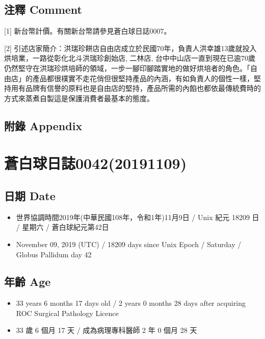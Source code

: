 \documentclass[a5paper, 12pt
]{book}
\providecommand{\tightlist}{%
  \setlength{\itemsep}{0pt}\setlength{\parskip}{0pt}}
\begin{document}
\hypertarget{ux6ce8ux91cb-comment-34}{%
\subsection{注釋 Comment}\label{ux6ce8ux91cb-comment-34}}

{[}1{]} 新台幣計價。有關新台幣請參見蒼白球日誌0007。

{[}2{]}
引述店家簡介：洪瑞珍餅店自由店成立於民國70年，負責人洪幸雄13歲就投入烘培業，一路從彰化北斗洪瑞珍創始店,
二林店,
台中中山店一直到現在已逾70歲仍然堅守在洪瑞珍烘培師的領域，一步一腳印腳踏實地的做好烘培者的角色。「自由店」的產品都很樸實不走花俏但很堅持產品的內涵，有如負責人的個性一樣，堅持用有品牌有信譽的原料也是自由店的堅持，產品所需的內餡也都依最傳統費時的方式來蒸煮自製這是保護消費者最基本的態度。

\hypertarget{ux9644ux9304-appendix-33}{%
\subsection{附錄 Appendix}\label{ux9644ux9304-appendix-33}}

\hypertarget{ux84bcux767dux7403ux65e5ux8a8c004220191109}{%
\section{蒼白球日誌0042(20191109)}\label{ux84bcux767dux7403ux65e5ux8a8c004220191109}}

\hypertarget{ux65e5ux671f-date-41}{%
\subsection{日期 Date}\label{ux65e5ux671f-date-41}}

\begin{itemize}
\tightlist
\item
  世界協調時間2019年(中華民國108年，令和1年)11月9日 / Unix 紀元 18209 日
  / 星期六 / 蒼白球紀元第42日
\item
  November 09, 2019 (UTC) / 18209 days since Unix Epoch / Saturday /
  Globus Pallidum day 42
\end{itemize}

\hypertarget{ux5e74ux9f61-age-41}{%
\subsection{年齡 Age}\label{ux5e74ux9f61-age-41}}

\begin{itemize}
\tightlist
\item
  33 years 6 months 17 days old / 2 years 0 months 28 days after
  acquiring ROC Surgical Pathology Licence
\item
  33 歲 6 個月 17 天 / 成為病理專科醫師 2 年 0 個月 28 天
\end{itemize}
\end{document}
